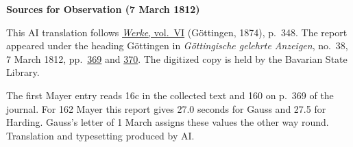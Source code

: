 \clearpage\thispagestyle{empty}
\begin{center}\textbf{Sources for Observation (7 March 1812)}\end{center}
\noindent This AI translation follows \href{https://gdz.sub.uni-goettingen.de/id/PPN236007467}{\textit{Werke}, vol.~VI} (Göttingen, 1874), p.~348. The report appeared under the heading Göttingen in \textit{Göttingische gelehrte Anzeigen}, no.~38, 7 March 1812, pp.~\href{https://api.digitale-sammlungen.de/iiif/image/v2/bsb10538681_00413/full/1600,/0/default.jpg}{369} and \href{https://api.digitale-sammlungen.de/iiif/image/v2/bsb10538681_00414/full/1600,/0/default.jpg}{370}. The digitized copy is held by the Bavarian State Library.
\par\smallskip\noindent The first Mayer entry reads 16c in the collected text and 160 on p.~369 of the journal. For 162 Mayer this report gives 27.0 seconds for Gauss and 27.5 for Harding. Gauss’s letter of 1 March assigns these values the other way round. Translation and typesetting produced by AI.
\clearpage
